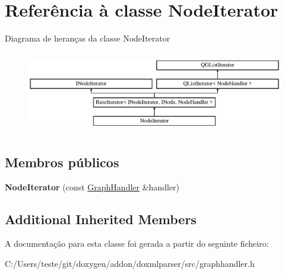 \hypertarget{class_node_iterator}{\section{Referência à classe Node\-Iterator}
\label{class_node_iterator}
}
Diagrama de heranças da classe Node\-Iterator\begin{figure}[H]
\begin{center}
\leavevmode
\includegraphics[height=3.601286cm]{class_node_iterator}
\end{center}
\end{figure}
\subsection*{Membros públicos}
\begin{DoxyCompactItemize}
\item 
\hypertarget{class_node_iterator_ad43eb32d0ffca9aa34a6812d9a9278a6}{{\bfseries Node\-Iterator} (const \hyperlink{class_graph_handler}{Graph\-Handler} \&handler)}\label{class_node_iterator_ad43eb32d0ffca9aa34a6812d9a9278a6}

\end{DoxyCompactItemize}
\subsection*{Additional Inherited Members}


A documentação para esta classe foi gerada a partir do seguinte ficheiro\-:\begin{DoxyCompactItemize}
\item 
C\-:/\-Users/teste/git/doxygen/addon/doxmlparser/src/graphhandler.\-h\end{DoxyCompactItemize}
